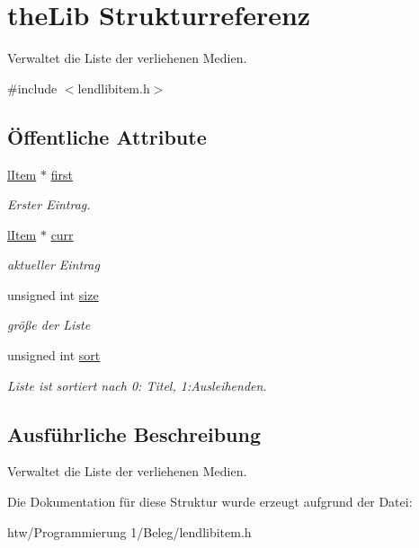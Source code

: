 \hypertarget{structthe_lib}{}\section{the\+Lib Strukturreferenz}
\label{structthe_lib}


Verwaltet die Liste der verliehenen Medien.  




{\ttfamily \#include $<$lendlibitem.\+h$>$}

\subsection*{Öffentliche Attribute}
\begin{DoxyCompactItemize}
\item 
\hyperlink{group___lend_lib_item_ga307bf11439a9dddcff69d464ae8df92b}{l\+Item} $\ast$ \hyperlink{structthe_lib_ae817c73add79bc6596184c9cf4a2de57}{first}\hypertarget{structthe_lib_ae817c73add79bc6596184c9cf4a2de57}{}\label{structthe_lib_ae817c73add79bc6596184c9cf4a2de57}

\begin{DoxyCompactList}\small\item\em Erster Eintrag. \end{DoxyCompactList}\item 
\hyperlink{group___lend_lib_item_ga307bf11439a9dddcff69d464ae8df92b}{l\+Item} $\ast$ \hyperlink{structthe_lib_aebb31962aaf384b2977d648bcb96635d}{curr}\hypertarget{structthe_lib_aebb31962aaf384b2977d648bcb96635d}{}\label{structthe_lib_aebb31962aaf384b2977d648bcb96635d}

\begin{DoxyCompactList}\small\item\em aktueller Eintrag \end{DoxyCompactList}\item 
unsigned int \hyperlink{structthe_lib_ade2a9f69323df7b98b666ba8f5d8b58b}{size}\hypertarget{structthe_lib_ade2a9f69323df7b98b666ba8f5d8b58b}{}\label{structthe_lib_ade2a9f69323df7b98b666ba8f5d8b58b}

\begin{DoxyCompactList}\small\item\em größe der Liste \end{DoxyCompactList}\item 
unsigned int \hyperlink{structthe_lib_aa3b69a306f0ce42df1d01f1d5a4a7bb3}{sort}\hypertarget{structthe_lib_aa3b69a306f0ce42df1d01f1d5a4a7bb3}{}\label{structthe_lib_aa3b69a306f0ce42df1d01f1d5a4a7bb3}

\begin{DoxyCompactList}\small\item\em Liste ist sortiert nach 0\+: Titel, 1\+:Ausleihenden. \end{DoxyCompactList}\end{DoxyCompactItemize}


\subsection{Ausführliche Beschreibung}
Verwaltet die Liste der verliehenen Medien. 

Die Dokumentation für diese Struktur wurde erzeugt aufgrund der Datei\+:\begin{DoxyCompactItemize}
\item 
htw/\+Programmierung 1/\+Beleg/lendlibitem.\+h\end{DoxyCompactItemize}
